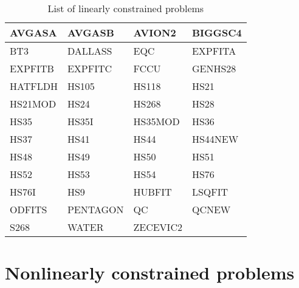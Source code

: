 \begin{longtable}{llll}
    \caption{List of linearly constrained problems}\\
    \toprule
    AVGASA  & AVGASB    & AVION2    & BIGGSC4\\
    \midrule
    BT3     & DALLASS   & EQC       & EXPFITA\\
    \midrule
    EXPFITB & EXPFITC   & FCCU      & GENHS28\\
    \midrule
    HATFLDH & HS105     & HS118     & HS21\\
    \midrule
    HS21MOD & HS24      & HS268     & HS28\\
    \midrule
    HS35    & HS35I     & HS35MOD   & HS36\\
    \midrule
    HS37    & HS41      & HS44      & HS44NEW\\
    \midrule
    HS48    & HS49      & HS50      & HS51\\
    \midrule
    HS52    & HS53      & HS54      & HS76\\
    \midrule
    HS76I   & HS9       & HUBFIT    & LSQFIT\\
    \midrule
    ODFITS  & PENTAGON  & QC        & QCNEW\\
    \midrule
    S268    & WATER     & ZECEVIC2\\
    \bottomrule
\end{longtable}

\section{Nonlinearly constrained problems}
\label{sec:list-nonlinearly-constrained-problems}

